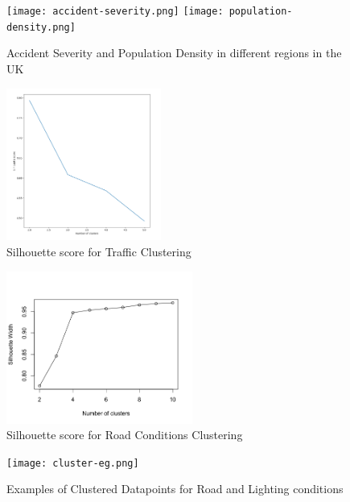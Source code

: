 \documentclass{neu_handout}
\begin{document}
\begin{figure}[!htb]
  \texttt{[image: accident-severity.png]}
\endminipage\hfill
{}
  \texttt{[image: population-density.png]}
  \endminipage
\caption{Accident Severity and Population Density in different regions in the UK}  
\end{figure}

\begin{figure}[!htb]
    \begin{center}
      \includegraphics[height=5cm]{silhouette-score-traffic.png}
      \caption{Silhouette score for Traffic Clustering}
    \end{center}
\end{figure}

\begin{figure}[!htb]
    \begin{center}
      \includegraphics[height=5cm]{silhouette_road_conditions.png}
      \caption{Silhouette score for Road Conditions Clustering}
    \end{center}
\end{figure}


\begin{figure}[!htb]
    \begin{center}
      \texttt{[image: cluster-eg.png]}
      \caption{Examples of Clustered Datapoints for Road and Lighting conditions}
    \end{center}
\end{figure}
\end{document}
